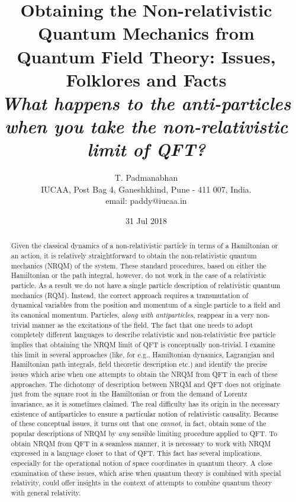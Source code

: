 \documentclass[12pt]{article}
\title{Obtaining the Non-relativistic Quantum Mechanics from Quantum Field Theory: Issues, Folklores and Facts\\
\vskip 1.1cm
{\textit{\Large What happens to the anti-particles when you take the non-relativistic limit of QFT?\\
}}}
\author{T. Padmanabhan\\
IUCAA, Post Bag 4, Ganeshkhind,
 Pune - 411 007, India.\\
email: paddy@iucaa.in}
\date{31 Jul 2018}
\begin{document}
\maketitle

\newpage

\begin{abstract}
 Given the classical dynamics of a non-relativistic particle in terms of a Hamiltonian or an action, it is relatively straightforward to obtain the non-relativistic quantum mechanics (NRQM) of the system. These standard procedures, based on either the Hamiltonian or the path integral, however, do not work in the case of a relativistic particle. As a result we do not have a single particle description of relativistic quantum mechanics (RQM). Instead, the correct approach requires a transmutation of dynamical variables from the position and momentum of a  single particle to a field and its canonical momentum. Particles, \textit{along with antiparticles},  reappear in a very non-trivial manner as the excitations of the field. The fact that one needs to adopt  completely different languages to describe  relativistic and non-relativistic free particle implies that obtaining the NRQM limit of QFT is conceptually non-trivial. I examine this limit in several approaches (like, for e.g., Hamiltonian dynamics, Lagrangian and Hamiltonian path integrals, field theoretic description etc.) and identify the precise issues which arise when one attempts to obtain the NRQM from QFT in each of these approaches. The dichotomy of description between NRQM and QFT  does not originate just  from the square root in the Hamiltonian or from the demand of Lorentz invariance, as it is sometimes claimed. The real difficulty has its origin in the necessary existence of antiparticles to ensure a particular notion of relativistic causality. Because of these conceptual issues, it turns out that one \textit{cannot}, in fact,  obtain  some of the popular descriptions of NRQM by \textit{any} sensible limiting procedure applied to QFT. To obtain NRQM from QFT in a  seamless manner, it is necessary to 
 work with NRQM expressed in a language  closer to that of QFT. This fact has several implications, especially for the operational notion of space coordinates in quantum theory. A close examination of these issues, which arise when quantum theory is combined with  special relativity,  could offer insights in the context of attempts to combine quantum theory with general relativity.  
\end{abstract}

\newpage
\tableofcontents
\newpage
\end{document}
